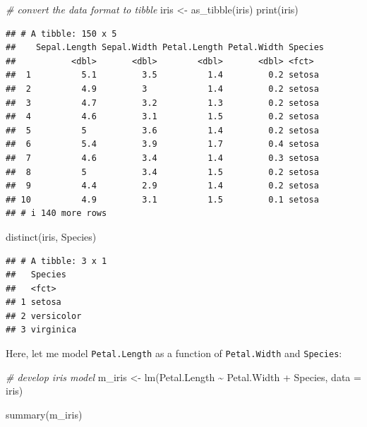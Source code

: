\documentclass[
]{book}
\newenvironment{Shaded}{\begin{snugshade}}{\end{snugshade}}
\newcommand{\AttributeTok}[1]{\textcolor[rgb]{0.77,0.63,0.00}{#1}}
\newcommand{\CommentTok}[1]{\textcolor[rgb]{0.56,0.35,0.01}{\textit{#1}}}
\newcommand{\FunctionTok}[1]{\textcolor[rgb]{0.00,0.00,0.00}{#1}}
\newcommand{\NormalTok}[1]{#1}
\newcommand{\OtherTok}[1]{\textcolor[rgb]{0.56,0.35,0.01}{#1}}
\newcommand{\SpecialCharTok}[1]{\textcolor[rgb]{0.00,0.00,0.00}{#1}}
\begin{document}
\begin{Shaded}
\begin{Highlighting}[]
\CommentTok{\# convert the data format to tibble}
\NormalTok{iris }\OtherTok{\textless{}{-}} \FunctionTok{as\_tibble}\NormalTok{(iris)}
\FunctionTok{print}\NormalTok{(iris)}
\end{Highlighting}
\end{Shaded}

\begin{verbatim}
## # A tibble: 150 x 5
##    Sepal.Length Sepal.Width Petal.Length Petal.Width Species
##           <dbl>       <dbl>        <dbl>       <dbl> <fct>  
##  1          5.1         3.5          1.4         0.2 setosa 
##  2          4.9         3            1.4         0.2 setosa 
##  3          4.7         3.2          1.3         0.2 setosa 
##  4          4.6         3.1          1.5         0.2 setosa 
##  5          5           3.6          1.4         0.2 setosa 
##  6          5.4         3.9          1.7         0.4 setosa 
##  7          4.6         3.4          1.4         0.3 setosa 
##  8          5           3.4          1.5         0.2 setosa 
##  9          4.4         2.9          1.4         0.2 setosa 
## 10          4.9         3.1          1.5         0.1 setosa 
## # i 140 more rows
\end{verbatim}

\begin{Shaded}
\begin{Highlighting}[]
\FunctionTok{distinct}\NormalTok{(iris, Species)}
\end{Highlighting}
\end{Shaded}

\begin{verbatim}
## # A tibble: 3 x 1
##   Species   
##   <fct>     
## 1 setosa    
## 2 versicolor
## 3 virginica
\end{verbatim}

Here, let me model \texttt{Petal.Length} as a function of \texttt{Petal.Width} and \texttt{Species}:

\begin{Shaded}
\begin{Highlighting}[]
\CommentTok{\# develop iris model}
\NormalTok{m\_iris }\OtherTok{\textless{}{-}} \FunctionTok{lm}\NormalTok{(Petal.Length }\SpecialCharTok{\textasciitilde{}}\NormalTok{ Petal.Width }\SpecialCharTok{+}\NormalTok{ Species,}
             \AttributeTok{data =}\NormalTok{ iris)}

\FunctionTok{summary}\NormalTok{(m\_iris)}
\end{Highlighting}
\end{Shaded}
\end{document}
